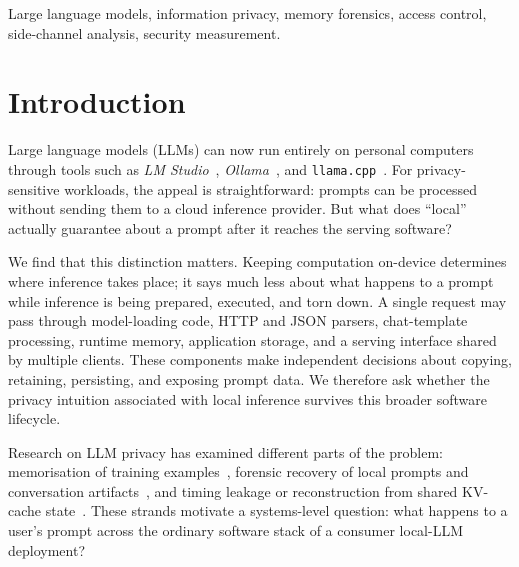 \documentclass[journal,tifs]{IEEEtran}
\begin{document}
\begin{IEEEkeywords}
Large language models, information privacy, memory forensics, access control, side-channel analysis, security measurement.
\end{IEEEkeywords}






\section{Introduction}
\label{sec:introduction}

Large language models (LLMs) can now run entirely on personal computers through tools such as \emph{LM Studio}~\cite{lmstudio}, \emph{Ollama}~\cite{ollama}, and \texttt{llama.cpp}~\cite{llamacpp}. For privacy-sensitive workloads, the appeal is straightforward: prompts can be processed without sending them to a cloud inference provider. But what does ``local'' actually guarantee about a prompt after it reaches the serving software?

We find that this distinction matters. Keeping computation on-device determines where inference takes place; it says much less about what happens to a prompt while inference is being prepared, executed, and torn down. A single request may pass through model-loading code, HTTP and JSON parsers, chat-template processing, runtime memory, application storage, and a serving interface shared by multiple clients. These components make independent decisions about copying, retaining, persisting, and exposing prompt data. We therefore ask whether the privacy intuition associated with local inference survives this broader software lifecycle.

Research on LLM privacy has examined different parts of the problem: memorisation of training examples~\cite{carlini2023memorization,carlini2025}, forensic recovery of local prompts and conversation artifacts~\cite{murtuza2026,localnotprivate2026,xu2026mobilellmforensics}, and timing leakage or reconstruction from shared KV-cache state~\cite{wu2025iknowwhatyouasked,safekv2025,prefixwall2026,shadowcache2026,optileak2026}. These strands motivate a systems-level question: what happens to a user's prompt across the ordinary software stack of a consumer local-LLM deployment?
\end{document}
